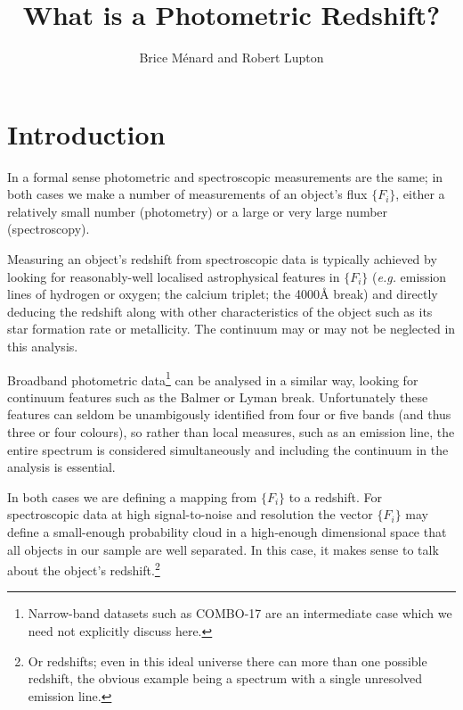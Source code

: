 \documentclass[12pt]{article}
\begin{document}
\title{What is a Photometric Redshift?}
\author{Brice M\'enard and Robert Lupton}
\maketitle

\newcommand{\eg}{\textit{e.g.}\xspace}
\newcommand\Fi{\{F_i\}}
\newcommand\FdFi{\{F_i, dF_i\}}
\newcommand{\ie}{\textit{i.e.}\xspace}
\newcommand{\photoz}{z_p\xspace}
\newcommand{\clusterz}{z_c\xspace}

\section{Introduction}

In a formal sense photometric and spectroscopic measurements are the same; in both cases we make a number of
measurements of an object's flux $\Fi$, either a relatively small number (photometry) or a large or very
large number (spectroscopy).

Measuring an object's redshift from spectroscopic data is typically achieved by looking for reasonably-well
localised astrophysical features in $\Fi$ (\eg emission lines of hydrogen or oxygen; the calcium
triplet; the 4000\AA{} break) and directly deducing the redshift along with other characteristics of the
object such as its star formation rate or metallicity.  The continuum may or may not be neglected in this
analysis.

Broadband photometric data\footnote{Narrow-band datasets such as COMBO-17 are an intermediate case which we
  need not explicitly discuss here.} can be analysed in a similar way, looking for continuum features such as
the Balmer or Lyman break.  Unfortunately these features can seldom be unambigously identified from four or
five bands (and thus three or four colours), so rather than local measures, such as an emission line, the
entire spectrum is considered simultaneously and including the continuum in the analysis is essential.

In both cases we are defining a mapping from $\Fi$ to a redshift. For spectroscopic data
at high signal-to-noise and resolution the vector $\Fi$ may define a small-enough probability cloud in a
high-enough dimensional space that all objects in our sample are well separated.  In this case, it makes sense
to talk about the object's redshift.\footnote{Or redshifts; even in this ideal universe there can more than one
  possible redshift, the obvious example being a spectrum with a single unresolved emission line.}
\end{document}
